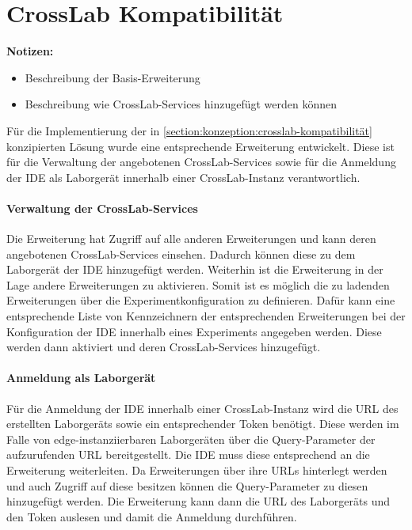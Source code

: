 \section{CrossLab Kompatibilität}\label{section:prototypische-implementierung:crosslab-kompatibilität}

\begin{note}
    \textbf{Notizen:}
    \begin{itemize}
        \item Beschreibung der Basis-Erweiterung
        \item Beschreibung wie CrossLab-Services hinzugefügt werden können
    \end{itemize}
\end{note}

Für die Implementierung der in \autoref{section:konzeption:crosslab-kompatibilität} konzipierten Lösung wurde eine entsprechende Erweiterung entwickelt. Diese ist für die Verwaltung der angebotenen CrossLab-Services sowie für die Anmeldung der IDE als Laborgerät innerhalb einer CrossLab-Instanz verantwortlich.

\paragraph{Verwaltung der CrossLab-Services}
Die Erweiterung hat Zugriff auf alle anderen Erweiterungen und kann deren angebotenen CrossLab-Services einsehen. Dadurch können diese zu dem Laborgerät der IDE hinzugefügt werden. Weiterhin ist die Erweiterung in der Lage andere Erweiterungen zu aktivieren. Somit ist es möglich die zu ladenden Erweiterungen über die Experimentkonfiguration zu definieren. Dafür kann eine entsprechende Liste von Kennzeichnern der entsprechenden Erweiterungen bei der Konfiguration der IDE innerhalb eines Experiments angegeben werden. Diese werden dann aktiviert und deren CrossLab-Services hinzugefügt.

\paragraph{Anmeldung als Laborgerät}
Für die Anmeldung der IDE innerhalb einer CrossLab-Instanz wird die URL des erstellten Laborgeräts sowie ein entsprechender Token benötigt. Diese werden im Falle von edge-instanziierbaren Laborgeräten über die Query-Parameter der aufzurufenden URL bereitgestellt. Die IDE muss diese entsprechend an die Erweiterung weiterleiten. Da Erweiterungen über ihre URLs hinterlegt werden und auch Zugriff auf diese besitzen können die Query-Parameter zu diesen hinzugefügt werden. Die Erweiterung kann dann die URL des Laborgeräts und den Token auslesen und damit die Anmeldung durchführen.

